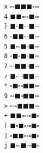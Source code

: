 \documentclass[a4paper]{article}
\begin{document}
\verb|x| $\square\square\blacksquare\blacksquare$\hspace{2cm}$\blacksquare\square\square\square$\\
\verb|4| $\blacksquare\blacksquare\square\square$\hspace{2cm}$\square\blacksquare\square\square$\\
\verb|}| $\blacksquare\square\blacksquare\square$\hspace{2cm}$\square\blacksquare\square\square$\\
\verb|6| $\square\blacksquare\blacksquare\square$\hspace{2cm}$\square\blacksquare\square\square$\\
\verb|5| $\blacksquare\square\square\blacksquare$\hspace{2cm}$\square\blacksquare\square\square$\\
\verb|8| $\square\blacksquare\square\blacksquare$\hspace{2cm}$\square\blacksquare\square\square$\\
\verb|7| $\square\square\blacksquare\blacksquare$\hspace{2cm}$\square\blacksquare\square\square$\\
\verb|z| $\blacksquare\square\square\square$\hspace{2cm}$\blacksquare\blacksquare\square\square$\\
\verb|*| $\square\blacksquare\square\square$\hspace{2cm}$\blacksquare\blacksquare\square\square$\\
\verb|9| $\square\square\blacksquare\square$\hspace{2cm}$\blacksquare\blacksquare\square\square$\\
\verb|>| $\square\square\square\blacksquare$\hspace{2cm}$\blacksquare\blacksquare\square\square$\\
\verb|+| $\blacksquare\blacksquare\square\square$\hspace{2cm}$\square\square\blacksquare\square$\\
\verb|[| $\blacksquare\square\blacksquare\square$\hspace{2cm}$\square\square\blacksquare\square$\\
\verb|]| $\square\blacksquare\blacksquare\square$\hspace{2cm}$\square\square\blacksquare\square$\\
\verb|j| $\blacksquare\square\square\blacksquare$\hspace{2cm}$\square\square\blacksquare\square$\\
\end{document}
